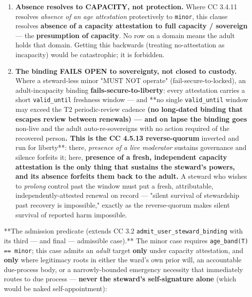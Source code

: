 \documentclass[11pt]{article}
\begin{document}
\begin{enumerate}\setlength\itemsep{0pt}
\item \textbf{Absence resolves to CAPACITY, not protection.} Where CC 3.4.11 resolves \textit{absence of an age attestation} protectively to \texttt{minor}, this clause resolves \textbf{absence of a capacity attestation to full capacity / sovereign} — the \textbf{presumption of capacity}. No row on a domain means the adult holds that domain. Getting this backwards (treating no-attestation as incapacity) would be catastrophic; it is forbidden.
\item \textbf{The binding FAILS OPEN to sovereignty, not closed to custody.} Where a steward-less minor "MUST NOT operate" (fail-secure-to-locked), an adult-incapacity binding \textbf{fails-secure-to-liberty}: every attestation carries a short \texttt{valid\_until} freshness window — and **no single \texttt{valid\_until} window may exceed the T2 periodic-review cadence\textbf{ (no long-dated binding that escapes review between renewals) — and on lapse the binding goes }non-live and the adult auto-re-sovereigns with no action required of the recovered person\textbf{. This is the CC 4.5.13 reverse-quorum }inverted and run for liberty**: there, \textit{presence of a live moderator} sustains governance and silence forfeits it; here, \textbf{presence of a fresh, independent capacity attestation is the only thing that sustains the steward's powers, and its absence forfeits them back to the adult.} A steward who wishes to \textit{prolong} control past the window must put a fresh, attributable, independently-attested renewal on record — "silent survival of stewardship past recovery is impossible," exactly as the reverse-quorum makes silent survival of reported harm impossible.
\end{enumerate}


**The admission predicate (extends CC 3.2 \texttt{admit\_user\_steward\_binding} with its third — and final — admissible case).** The minor case requires \texttt{age\_band(T) == minor}; this case admits an \textit{adult} target \textbf{only} under capacity attestation, and \textbf{only} where legitimacy roots in either the ward's own prior will, an accountable due-process body, or a narrowly-bounded emergency necessity that immediately routes to due process — \textbf{never the steward's self-signature alone} (which would be naked self-appointment):
\end{document}
